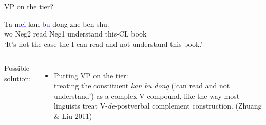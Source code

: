 \documentclass[professionalfonts, xcolor={usenames,svgnames,x11names,table}]{beamer}
\begin{document}
  
 \begin{frame}{VP on the tier?}
\begin{exe}
  \ex \gll Ta \textcolor{blue}{mei} kan \textcolor{blue}{bu} dong zhe-ben shu. \\
                       wo  Neg2  read  Neg1  understand  this-CL  book \\
                \glt `It's not the case the I can read and not understand this book.'
\end{exe}


\pause
\begin{columns}
 
 \pause
{}
Possible solution:\\
\begin{itemize}
\item Putting VP on the tier: \\treating the constituent \textit{kan bu dong} (`can read and not understand') as a complex V compound, like the way most linguists treat V-\textit{de}-postverbal complement construction. (Zhuang $\&$ Liu 2011)
\end{itemize}
\end{columns}
\end{frame}
  
\end{document}
